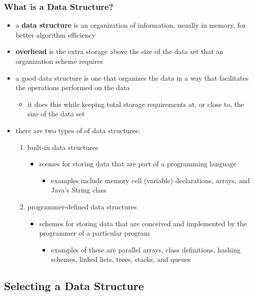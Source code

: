 \documentclass[11pt]{article}
\begin{document}
\subsubsection{What is a Data Structure?}
\label{sec:org0941551}
\begin{itemize}
\item a \textbf{data structure} is an organization of information, usually in memory, for better algorithm efficiency
\item \textbf{overhead} is the extra storage above the size of the data set that an organization scheme requires
\item a good data structure is one that organizes the data in a way that facilitates the operations performed on the data
\begin{itemize}
\item it does this while keeping total storage requirements at, or close to, the size of the data set
\end{itemize}
\item there are two types of of data structures:
\begin{enumerate}
\item built-in data structures
\begin{itemize}
\item scemes for storing data that are part of a programming language
\begin{itemize}
\item examples include memory cell (variable) declarations, arrays, and Java's String class
\end{itemize}
\end{itemize}
\item programmer-defined data structures
\begin{itemize}
\item schemes for storing data that are conceived and implemented by the programmer of a particular program
\begin{itemize}
\item examples of these are parallel arrays, class definitions, hashing schemes, linked lists, trees, stacks, and queues
\end{itemize}
\end{itemize}
\end{enumerate}
\end{itemize}

\subsection{Selecting a Data Structure}
\label{sec:orgbbdd5be}
\end{document}
